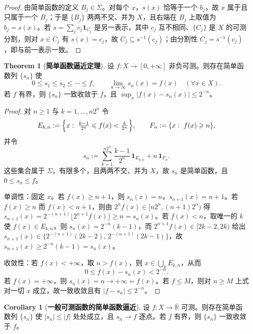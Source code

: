 \documentclass[oneside]{book}
\theoremstyle{definition}
\newcommand{\R}{\mathbb{R}}
\theoremstyle{definition}
\newtheorem{theorem}{Theorem}[section]
\newtheorem{corollary}{Corollary}[section]
\begin{document}
	\begin{proof}
		由简单函数的定义 $B_j\in\Sigma$。对每个 $x$，$s(x)$ 恰等于一个 $b_j$，故 $x$ 属于且只属于一个 $B_j$；于是 $\{B_j\}$ 两两不交、并为 $X$，且右端在 $B_j$ 上取值为 $b_j=s(x)$。若 $s=\sum_j c_j\mathbf{1}_{C_j}$ 是另一表示，其中 $c_j$ 互不相同、$\{C_j\}$ 是 $X$ 的可测分割，则对 $x\in C_j$ 有 $s(x)=c_j$，故 $C_j\subseteq s^{-1}(c_j)$；由分割性 $C_j=s^{-1}(c_j)$，即与前一表示一致。
	\end{proof}
	
	\begin{theorem}[\bfseries{简单函数逼近定理}]
		设 $f:X\to[0,+\infty]$ 非负可测。则存在简单函数列 $\{s_n\}$ 使
		\[
		0\leqslant s_1\leqslant s_2\leqslant\cdots\leqslant f,\qquad \lim_{n\to\infty}s_n(x)=f(x)\quad(\forall x\in X).
		\]
		若 $f$ 有界，则 $\{s_n\}$ 一致收敛于 $f$，且 $\sup_x|f(x)-s_n(x)|\leqslant2^{-n}$。
	\end{theorem}
	
	\begin{proof}
		对 $n\geqslant1$ 与 $k=1,\dots,n2^{n}$ 令
		\[
		E_{k,n}:=\Bigl\{x:\ \tfrac{k-1}{2^{n}}\leqslant f(x)<\tfrac{k}{2^{n}}\Bigr\},\qquad F_n:=\{x:\ f(x)\geqslant n\},
		\]
		并令
		\[
		s_n:=\sum_{k=1}^{n2^{n}}\frac{k-1}{2^{n}}\,\mathbf{1}_{E_{k,n}}+n\,\mathbf{1}_{F_n}.
		\]
		这些集合属于 $\Sigma$，有限多个，且两两不交、并为 $X$，故 $s_n$ 是简单函数，且 $0\leqslant s_n\leqslant f$。
		
		单调性：固定 $x$。若 $f(x)\geqslant n+1$，则 $s_n(x)=n$，$s_{n+1}(x)=n+1$。若 $f(x)\geqslant n$ 而 $f(x)<n+1$，则由 $2^{n}f(x)\in[n2^{n},(n+1)2^{n})$ 得 $s_{n+1}(x)=2^{-(n+1)}\lfloor 2^{n+1}f(x)\rfloor\geqslant n=s_n(x)$。若 $f(x)<n$，取唯一的 $k$ 使 $f(x)\in E_{k,n}$，则 $s_n(x)=2^{-n}(k-1)$，而 $2^{n+1}f(x)\in[2k-2,2k)$ 给出 $s_{n+1}(x)\in\{2^{-(n+1)}(2k-2),\,2^{-(n+1)}(2k-1)\}$，故 $s_{n+1}(x)\geqslant2^{-n}(k-1)=s_n(x)$。
		
		收敛性：若 $f(x)<+\infty$，取 $n>f(x)$，则 $x\in\bigcup_k E_{k,n}$，从而
		\[
		0\leqslant f(x)-s_n(x)<2^{-n}.
		\]
		若 $f(x)=+\infty$，则 $s_n(x)=n\to+\infty=f(x)$。若 $f\leqslant M$，则对 $n\geqslant M$ 上式对一切 $x$ 成立，故一致收敛且有 $|f-s_n|\leqslant2^{-n}$。
	\end{proof}
	
	\begin{corollary}[\bfseries{一般可测函数的简单函数逼近}]
		设 $f:X\to\overline{\R}$ 可测。则存在简单函数列 $\{s_n\}$ 使 $|s_n|\leqslant|f|$ 处处成立，且 $s_n\to f$ 逐点。若 $f$ 有界，则 $\{s_n\}$ 一致收敛于 $f$。
	\end{corollary}
	
\end{document}
